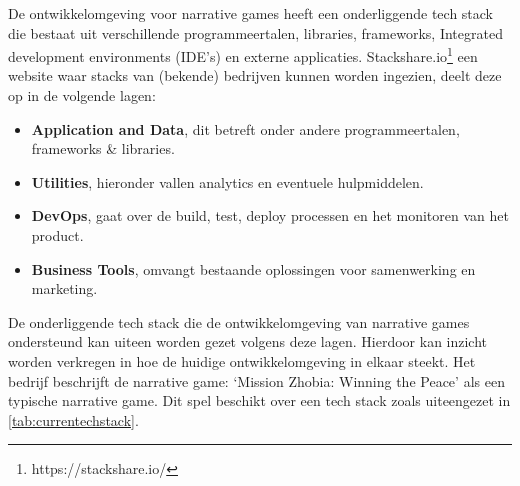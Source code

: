 De ontwikkelomgeving voor narrative games heeft een onderliggende tech stack die bestaat uit verschillende programmeertalen, libraries, frameworks, Integrated development environments (IDE’s) en externe applicaties. Stackshare.io\footnote{https://stackshare.io/} een website waar stacks van (bekende) bedrijven kunnen worden ingezien, deelt deze op in de volgende lagen\cite{StackShareCategories}:

\begin{itemize}
    \item \textbf{Application and Data}, dit betreft onder andere programmeertalen, frameworks \& libraries.
    \item \textbf{Utilities}, hieronder vallen analytics en eventuele hulpmiddelen.
    \item \textbf{DevOps}, gaat over de build, test, deploy processen en het monitoren van het product.
    \item \textbf{Business Tools}, omvangt bestaande oplossingen voor samenwerking en marketing.
\end{itemize}

De onderliggende tech stack die de ontwikkelomgeving van narrative games ondersteund kan uiteen worden gezet volgens deze lagen. Hierdoor kan inzicht worden verkregen in hoe de huidige ontwikkelomgeving in elkaar steekt. Het bedrijf beschrijft de narrative game: ‘Mission Zhobia: Winning the Peace’ als een typische narrative game. Dit spel beschikt over een tech stack zoals uiteengezet in \autoref{tab:currentechstack}.

